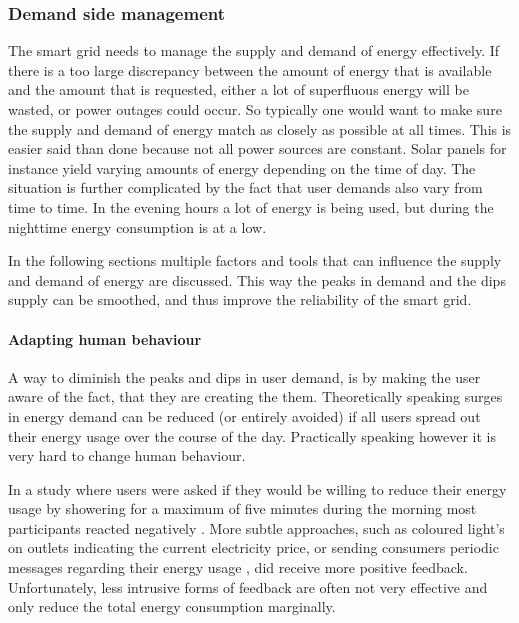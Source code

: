 \subsubsection{Demand side management}
The smart grid needs to manage the supply and demand of energy effectively. If there is a too large discrepancy between the amount of energy that is available and the amount that is requested, either a lot of superfluous energy will be wasted, or power outages could occur.
So typically one would want to make sure the supply and demand of energy match as closely as possible at all times. This is easier said than done because not all power sources are constant. Solar panels for instance yield varying amounts of energy depending on the time of day. The situation is further complicated by the fact that user demands also vary from time to time. In the evening hours a lot of energy is being used, but during the nighttime energy consumption is at a low.

In the following sections multiple factors and tools that can influence the supply and demand of energy are discussed. This way the peaks in demand and the dips supply can be smoothed, and thus improve the reliability of the smart grid.

\paragraph{Adapting human behaviour}
A way to diminish the peaks and dips in user demand, is by making the user aware of the fact, that they are creating the them. Theoretically speaking surges in energy demand can be reduced (or entirely avoided) if all users spread out their energy usage over the course of the day. Practically speaking however it is very hard to change human behaviour.

In a study where users were asked if they would be willing to reduce their energy usage by showering for a maximum of five minutes during the morning most participants reacted negatively \cite{GouldenBedwellRennick-EgglestoneEtAl2014}. More subtle approaches, such as coloured light's on outlets indicating the current electricity price, or sending consumers periodic messages regarding their energy usage \cite{AyresRasemanShih2012}, did receive more positive feedback. Unfortunately, less intrusive forms of feedback are often not very effective and only reduce the total energy consumption marginally.



